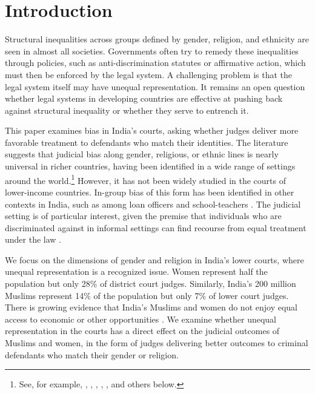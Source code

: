 \documentclass[12pt,english]{article}
\begin{document}
\section{Introduction}

Structural inequalities across groups defined by gender, religion, and ethnicity are seen in almost all societies. Governments often try to remedy these inequalities through policies, such as anti-discrimination statutes or affirmative action, which must then be  enforced by the legal system. A challenging problem is that the legal system itself may have unequal representation. It remains an open question whether legal systems in developing countries are effective at pushing back against structural inequality or whether they serve to entrench it.

This paper examines bias in India's courts, asking whether judges deliver more favorable treatment to defendants who match their identities. The literature suggests that judicial bias along gender, religious, or ethnic lines is nearly universal in richer countries, having been identified in a wide range of settings around the world.\footnote{See, for example, \citet{ShayoZussman2011QJE}, \citet{Didwania2018CLE}, \citet{arnold2018racial}, \citet{AbramsBertrandMullainathan2012TJoLS}, \citet{AlesinaLaFerrara2014TAER}, \citet{anwar2019jury} and others below.} However, it has not been widely studied in the courts of lower-income countries. In-group bias of this form has been identified in other contexts in India, such as among loan officers \citep{fisman2020experience} and school-teachers \citep{HannaLinden2012AEJEP}. The judicial setting is of particular interest, given the premise that individuals who are discriminated against in informal settings can find recourse from equal treatment under the law \citep{sandefur2013}.

We focus on the dimensions of gender and religion in India's lower courts, where unequal representation is a recognized issue. Women represent half the population but only 28\% of district court judges. Similarly, India's 200 million Muslims represent 14\% of the population but only 7\% of lower court judges. There is growing evidence that India's Muslims and women do not enjoy equal access to economic or other opportunities \citep{ito2009caste,BertrandHannaMullainathan2010JoPE,HannaLinden2012AEJEP,jayachandran2015roots,borker2017safety,anr2020mob}. We examine whether unequal representation in the courts has a direct effect on the judicial outcomes of Muslims and women, in the form of judges delivering better outcomes to criminal defendants who match their gender or religion.
\end{document}
